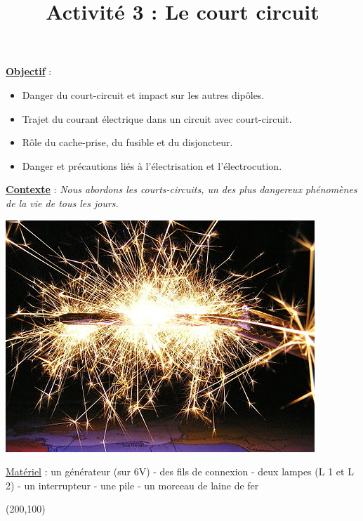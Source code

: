 \documentclass[10pt]{article}
\newcommand{\titreActivite}{Activité 3 : Le court circuit} %
\newcommand{\objectif}{ 	
	
	\begin{itemize}
		\item Danger du court-circuit et impact sur les autres dipôles.
		\item Trajet du courant électrique dans un circuit avec court-circuit.
		\item Rôle du cache-prise, du fusible et du disjoncteur.
		\item Danger et précautions liés à l'électrisation et l'électrocution.
	\end{itemize}
} %
\newcommand{\contexte}{
	Nous abordons les courts-circuits, un des plus dangereux phénomènes de la vie de tous les jours.
}
\begin{document}
\date{}
\title{\titreActivite}
\maketitle %


\underline{\textbf{Objectif}} :  \vspace{2pt}
\objectif

\vspace{4pt}

\underline{\textbf{Contexte}} :  \textit{\contexte}

\begin{center}
	\includegraphics[width=0.55\columnwidth]{activité.jpg} %
\end{center}



\underline{Matériel} : un générateur (sur 6V) - des fils de connexion - deux lampes (L 1 et L 2) - un interrupteur - une
pile - un morceau de laine de fer



\begin{minipage}[c]{0.45\textwidth}
	\begin{question}
	\end{question}
\end{minipage}
\hspace{ 20pt}
\begin{minipage}[c]{0.45\textwidth}
	\begin{center}
		\framebox(200,100){}
	\end{center}
\end{minipage}
\end{document}

